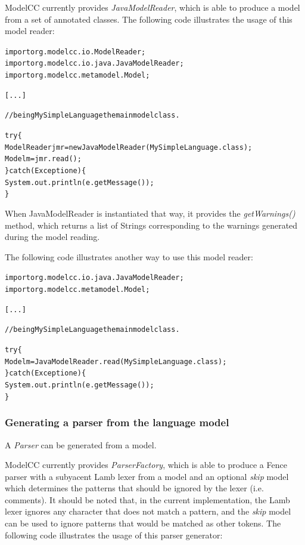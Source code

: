 \documentclass[a4paper,twoside,onecolumn]{article}
\newenvironment{colframe}{%
  \begin{Sbox} 
    \begin{minipage}{.8\columnwidth} 
}{%

  \end{minipage} 
  \end{Sbox} 
  \begin{center} 
    \fcolorbox{black}{MyGray}{\TheSbox} 
  \end{center} 
}
\begin{document}
ModelCC currently provides \emph{JavaModelReader}, which is able to produce a model from a set of annotated classes. The following code illustrates the usage of this model reader:

\begin{colframe}
\begin{alltt}
import org.modelcc.io.ModelReader;
import org.modelcc.io.java.JavaModelReader;
import org.modelcc.metamodel.Model;


[...]

//being MySimpleLanguage the main model class.

try \{
  ModelReader jmr = new JavaModelReader(MySimpleLanguage.class);
  Model m = jmr.read();
\} catch (Exception e) \{
  System.out.println(e.getMessage());
\}
\end{alltt}
\end{colframe}

When JavaModelReader is instantiated that way, it provides the \emph{getWarnings()} method, which returns a list of Strings corresponding to the warnings generated during the model reading.

The following code illustrates another way to use this model reader:

\begin{colframe}
\begin{alltt}
import org.modelcc.io.java.JavaModelReader;
import org.modelcc.metamodel.Model;

[...]

//being MySimpleLanguage the main model class.

try \{
  Model m = JavaModelReader.read(MySimpleLanguage.class);
\} catch (Exception e) \{
  System.out.println(e.getMessage());
\}
\end{alltt}
\end{colframe}


\subsubsection{Generating a parser from the language model} \label{sec:genpar}

A \emph{Parser} can be generated from a model.

ModelCC currently provides \emph{ParserFactory}, which is able to produce a Fence parser with a subyacent Lamb lexer from a model and an optional \emph{skip} model which determines the patterns that should be ignored by the lexer (i.e. comments). It should be noted that, in the current implementation, the Lamb lexer ignores any character that does not match a pattern, and the \emph{skip} model can be used to ignore patterns that would be matched as other tokens. The following code illustrates the usage of this parser generator:
\end{document}
